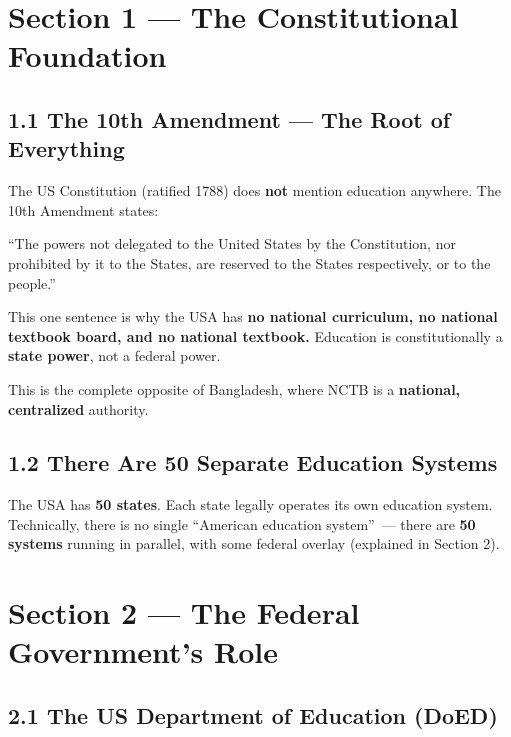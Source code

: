 

	\section{Section 1 --- The Constitutional Foundation}

	\subsection{1.1 The 10th Amendment --- The Root of Everything}

	The US Constitution (ratified 1788) does \textbf{not} mention education anywhere. The 10th Amendment states:

	\begin{important}
		``The powers not delegated to the United States by the Constitution, nor prohibited by it to the States, are reserved to the States respectively, or to the people.''
	\end{important}

	This one sentence is why the USA has \textbf{no national curriculum, no national textbook board, and no national textbook.} Education is constitutionally a \textbf{state power}, not a federal power.

	This is the complete opposite of Bangladesh, where NCTB is a \textbf{national, centralized} authority.

	\subsection{1.2 There Are 50 Separate Education Systems}

	The USA has \textbf{50 states}. Each state legally operates its own education system. Technically, there is no single ``American education system''~--- there are \textbf{50 systems} running in parallel, with some federal overlay (explained in Section 2).

	\section{Section 2 --- The Federal Government's Role}

	\subsection{2.1 The US Department of Education (DoED)}

